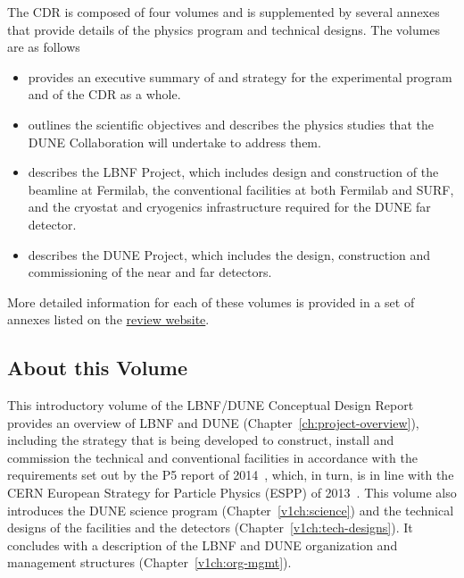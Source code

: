 The CDR is composed of four volumes and is supplemented
by several annexes that provide details of the physics program and technical designs. The volumes are as follows

\begin{itemize}
\item \volintro{} provides an executive summary of and strategy for the experimental 
program and of the CDR as a whole.
\item \volphys outlines the scientific objectives and describes the physics studies that 
the DUNE Collaboration will undertake to address them.
\item \vollbnf{} describes the LBNF Project, which includes design and construction of the 
beamline at Fermilab, the conventional facilities at both Fermilab and SURF, and the cryostat
 and cryogenics infrastructure required for the DUNE far detector.
\item \voldune{} describes the DUNE Project, which includes the design, construction and 
commissioning of the near and far detectors. 
\end{itemize}

More detailed information for each of these volumes is provided in a set of annexes listed on the \href{https://web.fnal.gov/project/LBNF/ReviewsAndAssessments/LBNF-DUNE%20CD-1-Refresh%20Directors%20Review/SitePages/Home.aspx}{review website}. 


\subsection{About this Volume}

This introductory volume of the LBNF/DUNE Conceptual Design Report provides an overview of LBNF and
DUNE (Chapter~\ref{ch:project-overview}), including the strategy that is being developed to construct, install and commission the technical and conventional facilities in accordance with the requirements set out by the P5 report of 2014~\cite{p5report2014}, which, in turn, is in line with the CERN
European Strategy for Particle Physics (ESPP) of 2013~\cite{ESPP-2012}. This volume also introduces the DUNE science program (Chapter~\ref{v1ch:science}) and the technical designs of the facilities and the detectors 
(Chapter~\ref{v1ch:tech-designs}). It concludes with a description of the LBNF and DUNE organization and management structures (Chapter~\ref{v1ch:org-mgmt}).



